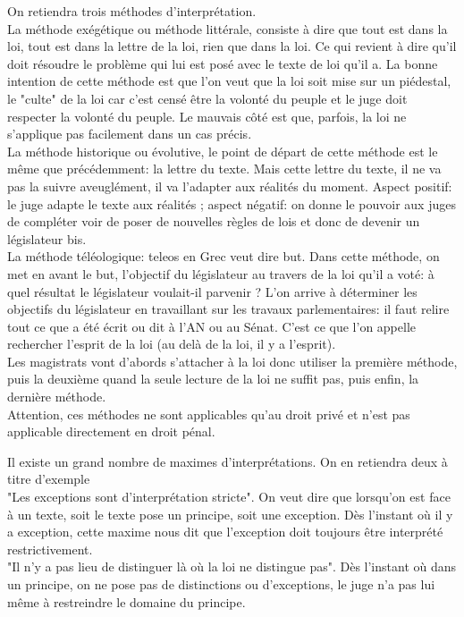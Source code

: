 On retiendra trois méthodes d'interprétation. \\
La méthode exégétique ou méthode littérale, consiste à dire que tout est dans la loi, tout est dans la lettre de la loi, rien que dans la loi. Ce qui revient à dire qu'il doit résoudre le problème qui lui est posé avec le texte de loi qu'il a. La bonne intention de cette méthode est que l'on veut que la loi soit mise sur un piédestal, le "culte" de la loi car c'est censé être la volonté du peuple et le juge doit respecter la volonté du peuple. Le mauvais côté est que, parfois, la loi ne s'applique pas facilement dans un cas précis. \\
La méthode historique ou évolutive, le point de départ de cette méthode est le même que précédemment: la lettre du texte. Mais cette lettre du texte, il ne va pas la suivre aveuglément, il va l'adapter aux réalités du moment. Aspect positif: le juge adapte le texte aux réalités ; aspect négatif: on donne le pouvoir aux juges de compléter voir de poser de nouvelles règles de lois et donc de devenir un législateur bis. \\
La méthode téléologique: teleos en Grec veut dire but. Dans cette méthode, on met en avant le but, l'objectif du législateur au travers de la loi qu'il a voté: à quel résultat le législateur voulait-il parvenir ? L'on arrive à déterminer les objectifs du législateur en travaillant sur les travaux parlementaires: il faut relire tout ce que a été écrit ou dit à l'AN ou au Sénat. C'est ce que l'on appelle rechercher l'esprit de la loi (au delà de la loi, il y a l'esprit). \\
Les magistrats vont d'abords s'attacher à la loi donc utiliser la première méthode, puis la deuxième quand la seule lecture de la loi ne suffit pas, puis enfin, la dernière méthode. \\
Attention, ces méthodes ne sont applicables qu'au droit privé et n'est pas applicable directement en droit pénal.


Il existe un grand nombre de maximes d'interprétations. On en retiendra deux à titre d'exemple \\
"Les exceptions sont d'interprétation stricte". On veut dire que lorsqu'on est face à un texte, soit le texte pose un principe, soit une exception. Dès l'instant où il y a exception, cette maxime nous dit que l'exception doit toujours être interprété restrictivement. \\
"Il n'y a pas lieu de distinguer là où la loi ne distingue pas". Dès l'instant où dans un principe, on ne pose pas de distinctions ou d'exceptions, le juge n'a pas lui même à restreindre le domaine du principe.

